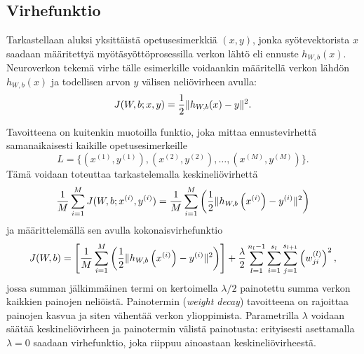 \documentclass[12pt,a4paper,finnish,oneside,titlepage]{article}
\DeclarePairedDelimiter\norm{\lVert}{\rVert}%
\theoremstyle{plain}
\theoremstyle{definition}
\theoremstyle{remark}
\begin{document}
\subsection{Virhefunktio}
Tarkastellaan aluksi yksittäistä opetusesimerkkiä \((x, y)\), jonka syötevektorista \(x\) saadaan määritettyä myötäsyöttöprosessilla verkon lähtö eli ennuste \(h_{W,b}(x)\). Neuroverkon tekemä virhe tälle esimerkille voidaankin määritellä verkon lähdön \(h_{W,b}(x)\) ja todellisen arvon \(y\) välisen neliövirheen avulla:
\[J(W, b; x, y)=\frac{1}{2}\norm{h_{W,b}(x)-y}^2.\]

Tavoitteena on kuitenkin muotoilla funktio, joka mittaa ennustevirhettä samanaikaisesti kaikille opetusesimerkeille \[L=\{(x^{(1)}, y^{(1)}), (x^{(2)}, y^{(2)}), \ldots, (x^{(M)}, y^{(M)})\}.\] Tämä voidaan toteuttaa tarkastelemalla keskineliövirhettä \[\frac{1}{M} \sum_{i=1}^{M} J(W, b; x^{(i)}, y^{(i)})=\frac{1}{M}\sum_{i=1}^{M} \left(\frac{1}{2}\norm{h_{W, b}\left(x^{(i)}\right)-y^{(i)}}^2\right)\] ja määrittelemällä sen avulla kokonaisvirhefunktio \[J(W, b)=\left[\frac{1}{M}\sum_{i=1}^{M} \left(\frac{1}{2}\norm{h_{W, b}\left(x^{(i)}\right)-y^{(i)}}^2\right)\right]+\frac{\lambda}{2}\sum_{l=1}^{n_l-1}\sum_{i=1}^{s_l}\sum_{j=1}^{s_{l+1}} \left(w_{ji}^{(l)}\right)^2,\] jossa summan jälkimmäinen termi on kertoimella \(\lambda/2\) painotettu summa verkon kaikkien painojen neliöistä. Painotermin (\textit{weight decay}) tavoitteena on rajoittaa painojen kasvua ja siten vähentää verkon ylioppimista. Parametrilla \(\lambda\) voidaan säätää keskineliövirheen ja painotermin välistä painotusta: erityisesti asettamalla \(\lambda=0\) saadaan virhefunktio, joka riippuu ainoastaan keskineliövirheestä.
\end{document}
